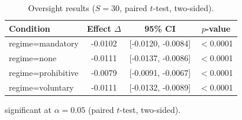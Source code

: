 \begin{table}[t]
  \centering
  \caption{Oversight results ($S=30$, paired $t$-test, two-sided).}
  \label{tab:oversight}
  \begin{tabular}{lccc}
    \toprule
    Condition & Effect $\Delta$ & 95\% CI & $p$-value \\
    \midrule
    regime=mandatory & -0.0102\dag{} & [-0.0120, -0.0084] & $<$0.0001 \\
    regime=none & -0.0111\dag{} & [-0.0137, -0.0086] & $<$0.0001 \\
    regime=prohibitive & -0.0079\dag{} & [-0.0091, -0.0067] & $<$0.0001 \\
    regime=voluntary & -0.0111\dag{} & [-0.0132, -0.0089] & $<$0.0001 \\
    \bottomrule
  \end{tabular}
  \begin{minipage}{\linewidth}
    \vspace{4pt}
    \footnotesize \dag{} significant at $\alpha = 0.05$ (paired $t$-test, two-sided).
  \end{minipage}
\end{table}
